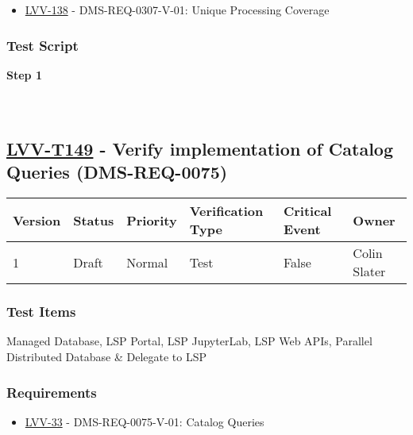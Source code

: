 \begin{itemize}
\tightlist
\item
  \href{https://jira.lsstcorp.org/browse/LVV-138}{LVV-138} -
  DMS-REQ-0307-V-01: Unique Processing Coverage
\end{itemize}

\hypertarget{test-script-125}{%
\subsubsection{Test Script}\label{test-script-125}}

\textbf{Step 1}\\
~\\
~\\

\hypertarget{lvv-t149---verify-implementation-of-catalog-queries-dms-req-0075}{%
\subsection{\texorpdfstring{\href{https://jira.lsstcorp.org/secure/Tests.jspa\#/testCase/LVV-T149}{LVV-T149}
- Verify implementation of Catalog Queries
(DMS-REQ-0075)}{LVV-T149 - Verify implementation of Catalog Queries (DMS-REQ-0075)}}\label{lvv-t149---verify-implementation-of-catalog-queries-dms-req-0075}}

\begin{longtable}[]{@{}llllll@{}}
\toprule
Version & Status & Priority & Verification Type & Critical Event &
Owner\tabularnewline
\midrule
\endhead
1 & Draft & Normal & Test & False & Colin Slater\tabularnewline
\bottomrule
\end{longtable}

\hypertarget{test-items-125}{%
\subsubsection{Test Items}\label{test-items-125}}

Managed Database, LSP Portal, LSP JupyterLab, LSP Web APIs, Parallel
Distributed Database \& Delegate to LSP

\hypertarget{requirements-126}{%
\subsubsection{Requirements}\label{requirements-126}}

\begin{itemize}
\tightlist
\item
  \href{https://jira.lsstcorp.org/browse/LVV-33}{LVV-33} -
  DMS-REQ-0075-V-01: Catalog Queries
\end{itemize}

